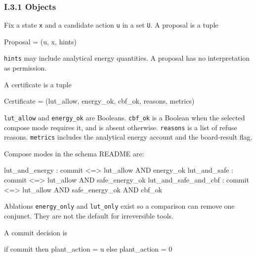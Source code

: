 \documentclass[
  10pt,
]{article}
\newenvironment{Shaded}{}{}
\newcommand{\NormalTok}[1]{#1}
\begin{document}
\subsubsection{I.3.1 Objects}\label{i.3.1-objects}

Fix a state \texttt{x} and a candidate action \texttt{u} in a set
\texttt{U}. A proposal is a tuple

\begin{Shaded}
\begin{Highlighting}[]
\NormalTok{Proposal = (u, x, hints)}
\end{Highlighting}
\end{Shaded}

\texttt{hints} may include analytical energy quantities. A proposal has
no interpretation as permission.

A certificate is a tuple

\begin{Shaded}
\begin{Highlighting}[]
\NormalTok{Certificate = (lut\_allow, energy\_ok, cbf\_ok, reasons, metrics)}
\end{Highlighting}
\end{Shaded}

\texttt{lut\_allow} and \texttt{energy\_ok} are Booleans.
\texttt{cbf\_ok} is a Boolean when the selected compose mode requires
it, and is absent otherwise. \texttt{reasons} is a list of refuse
reasons. \texttt{metrics} includes the analytical energy account and the
board-result flag.

Compose modes in the schema README are:

\begin{Shaded}
\begin{Highlighting}[]
\NormalTok{lut\_and\_energy        : commit \textless{}=\textgreater{} lut\_allow AND energy\_ok}
\NormalTok{lut\_and\_safe          : commit \textless{}=\textgreater{} lut\_allow AND safe\_energy\_ok}
\NormalTok{lut\_and\_safe\_and\_cbf  : commit \textless{}=\textgreater{} lut\_allow AND safe\_energy\_ok AND cbf\_ok}
\end{Highlighting}
\end{Shaded}

Ablations \texttt{energy\_only} and \texttt{lut\_only} exist so a
comparison can remove one conjunct. They are not the default for
irreversible tools.

A commit decision is

\begin{Shaded}
\begin{Highlighting}[]
\NormalTok{if commit then plant\_action = u else plant\_action = 0}
\end{Highlighting}
\end{Shaded}
\end{document}
